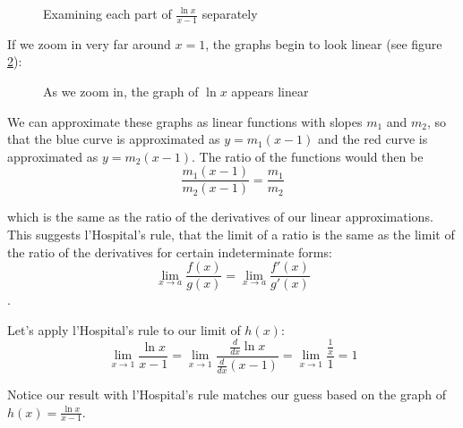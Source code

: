 \begin{figure}[htbp]
\centering
{}
\caption{Examining each part of $\frac{\ln{x}}{x-1}$ separately}
\label{fig:zoom1}
\end{figure}

If we zoom in very far around $x=1$, the graphs begin to look linear (see 
figure \ref{fig:zoom2}):

\begin{figure}[htbp]
\centering
{}
\caption{As we zoom in, the graph of $\ln{x}$ appears linear}
\label{fig:zoom2}
\end{figure}

We can approximate these graphs as linear functions with slopes $m_1$ and 
$m_2$, so that the blue curve is approximated as $y=m_1(x-1)$ and the red 
curve is approximated as $y=m_2(x-1)$. The ratio of the functions would then 
be 
$$\frac{m_1(x-1)}{m_2(x-1)}=\frac{m_1}{m_2}$$ 

which is the same as the ratio of the derivatives of our linear approximations. 
This suggests l'Hospital's rule, that the limit of a ratio is the same as the 
limit of the ratio of the derivatives for certain indeterminate forms: 
$$\lim_{x\to a}\frac{f(x)}{g(x)}=\lim_{x\to a}\frac{f'(x)}{g'(x)}$$.

Let's apply l'Hospital's rule to our limit of $h(x)$:
$$\lim_{x\to 1} \frac{\ln{x}}{x - 1} = \lim_{x \to 1} \frac{\frac{d}{dx} 
\ln{x}}{\frac{d}{dx} (x - 1)} = \lim_{x \to 1} \frac{\frac{1}{x}}{1}=1$$

Notice our result with l'Hospital's rule matches our guess based on the graph 
of $h(x) = \frac{\ln{x}}{x-1}$. 

